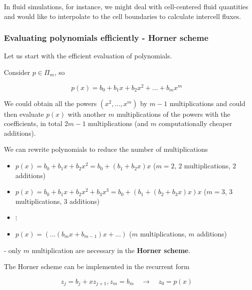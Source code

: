 
In fluid simulations, for instance,
we might deal with cell-centered fluid quantities and would like to interpolate to the
cell boundaries to calculate intercell fluxes.

\subsubsection{Evaluating polynomials efficiently - Horner scheme}

Let us start with the efficient evaluation of polynomials.

Consider $p \in \Pi_m$, so

\begin{equation}
    p(x) = b_0 + b_1 x + b_2 x^2 + ... + b_m x^m
\end{equation}

We could obtain all the powers $(x^2,...,x^m)$ by $m-1$ multiplications
and could then evaluate $p(x)$ with another $m$ multiplications
of the powers with the coefficients, in total $2m - 1$ multiplications
(and $m$ computationally cheaper additions).

We can rewrite polynomials to reduce the number of multiplications

\begin{itemize}
    \item $p(x) = b_0 + b_1 x + b_2 x^2 = b_0 + (b_1 + b_2 x) x$ ($m = 2$, $2$ multiplications, $2$ additions)
    \item $p(x) = b_0 + b_1 x + b_2 x^2 + b_3 x^3 = b_0 + (b_1 + (b_2 + b_3 x) x) x$ ($m = 3$, $3$ multiplications, $3$ additions)
    \item $\vdots$
    \item $p(x) = (\dots (b_m x + b_{m-1})x + \dots )$ ($m$ multiplications, $m$ additions)
\end{itemize}

- only $m$ multiplication are necessary in the \textbf{Horner scheme}.

The Horner scheme can be implemented in the recurrent form

\begin{equation}
    z_j = b_j + x z_{j+1}, z_m = b_m \quad \rightarrow \quad z_0 = p(x)
\end{equation}

